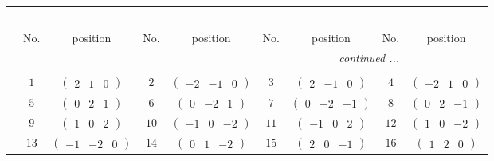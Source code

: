 \documentclass[fleqn,10pt,landscape]{article}
\begin{document}
\begin{itemize}
{\begin{center}
\begin{longtable}{ccccccccc}
\multicolumn{8}{l}{\tablename\ \thetable{}} \\
 \hline \hline
 & No. & position & No. & position & No. & position & No. & position \\ \hline \endhead

 \hline \hline
\multicolumn{8}{r}{\footnotesize\it continued ...} \\ \endfoot

 \hline \hline
\multicolumn{8}{r}{} \\ \endlastfoot

 & $ 1 $ & $ \begin{pmatrix} 2 & 1 & 0 \end{pmatrix} $ & $ 2 $ & $ \begin{pmatrix} -2 & -1 & 0 \end{pmatrix} $ & $ 3 $ & $ \begin{pmatrix} 2 & -1 & 0 \end{pmatrix} $ & $ 4 $ & $ \begin{pmatrix} -2 & 1 & 0 \end{pmatrix} $ \\
& $ 5 $ & $ \begin{pmatrix} 0 & 2 & 1 \end{pmatrix} $ & $ 6 $ & $ \begin{pmatrix} 0 & -2 & 1 \end{pmatrix} $ & $ 7 $ & $ \begin{pmatrix} 0 & -2 & -1 \end{pmatrix} $ & $ 8 $ & $ \begin{pmatrix} 0 & 2 & -1 \end{pmatrix} $ \\
& $ 9 $ & $ \begin{pmatrix} 1 & 0 & 2 \end{pmatrix} $ & $ 10 $ & $ \begin{pmatrix} -1 & 0 & -2 \end{pmatrix} $ & $ 11 $ & $ \begin{pmatrix} -1 & 0 & 2 \end{pmatrix} $ & $ 12 $ & $ \begin{pmatrix} 1 & 0 & -2 \end{pmatrix} $ \\
& $ 13 $ & $ \begin{pmatrix} -1 & -2 & 0 \end{pmatrix} $ & $ 14 $ & $ \begin{pmatrix} 0 & 1 & -2 \end{pmatrix} $ & $ 15 $ & $ \begin{pmatrix} 2 & 0 & -1 \end{pmatrix} $ & $ 16 $ & $ \begin{pmatrix} 1 & 2 & 0 \end{pmatrix} $ \\

\end{longtable}
\end{center}}
\end{itemize}
\end{document}
